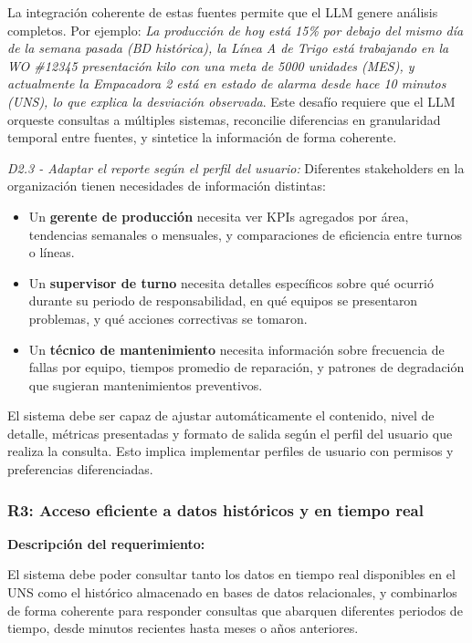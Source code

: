 La integración coherente de estas fuentes permite que el LLM genere análisis completos. Por ejemplo: \textit{La producción de hoy está 15\% por debajo del mismo día de la semana pasada (BD histórica), la Línea A de Trigo está trabajando en la WO \#12345 presentación kilo con una meta de 5000 unidades (MES), y actualmente la Empacadora 2 está en estado de alarma desde hace 10 minutos (UNS), lo que explica la desviación observada}. Este desafío requiere que el LLM orqueste consultas a múltiples sistemas, reconcilie diferencias en granularidad temporal entre fuentes, y sintetice la información de forma coherente.

\label{des:D2.3}
\textit{D2.3 - Adaptar el reporte según el perfil del usuario:} Diferentes stakeholders en la organización tienen necesidades de información distintas:

\begin{itemize}
    \item Un \textbf{gerente de producción} necesita ver KPIs agregados por área, tendencias semanales o mensuales, y comparaciones de eficiencia entre turnos o líneas.
    \item Un \textbf{supervisor de turno} necesita detalles específicos sobre qué ocurrió durante su periodo de responsabilidad, en qué equipos se presentaron problemas, y qué acciones correctivas se tomaron.
    \item Un \textbf{técnico de mantenimiento} necesita información sobre frecuencia de fallas por equipo, tiempos promedio de reparación, y patrones de degradación que sugieran mantenimientos preventivos.
\end{itemize}

El sistema debe ser capaz de ajustar automáticamente el contenido, nivel de detalle, métricas presentadas y formato de salida según el perfil del usuario que realiza la consulta. Esto implica implementar perfiles de usuario con permisos y preferencias diferenciadas.

\subsubsection{R3: Acceso eficiente a datos históricos y en tiempo real}
\label{req:R3}

\textbf{Descripción del requerimiento:}

El sistema debe poder consultar tanto los datos en tiempo real disponibles en el UNS como el histórico almacenado en bases de datos relacionales, y combinarlos de forma coherente para responder consultas que abarquen diferentes periodos de tiempo, desde minutos recientes hasta meses o años anteriores.

